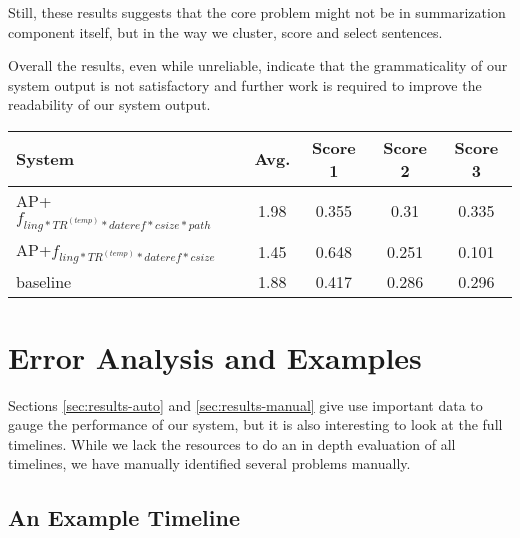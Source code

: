 \documentclass[a4paper,BCOR=10mm]{report}
\numberwithin{lemma}{chapter}
\numberwithin{definition}{chapter}
\begin{document}
Still, these results suggests that the core problem might not be in summarization component itself, but in the way we cluster, score and select sentences.

Overall the results, even while unreliable, indicate that the grammaticality of our system output is not satisfactory and further work is required to improve the readability of our system output.

\begin{table}
\begin{tabular}{|l|c|ccc|}
System & Avg. & Score 1 & Score 2 & Score 3 \\\hline
AP+$f_{ ling*TR^{(temp)}*\mathit{dateref}*\mathit{csize} * \mathit{path}}$ & 1.98 & 0.355 & 0.31 & 0.335 \\
AP+$f_{ ling*TR^{(temp)}*\mathit{dateref}*\mathit{csize}}$ & 1.45 & 0.648 & 0.251 & 0.101 \\
baseline & 1.88 & 0.417 & 0.286 & 0.296 \\
\end{tabular}

\end{table}

\chapter{Error Analysis and Examples}  \label{sec:errors}

Sections \ref{sec:results-auto} and \ref{sec:results-manual} give use important data to gauge the performance of our system, but it is also interesting to look at the full timelines.
While we lack the resources to do an in depth evaluation of all timelines, we have manually identified several problems manually.

\section{An Example Timeline}
\end{document}
